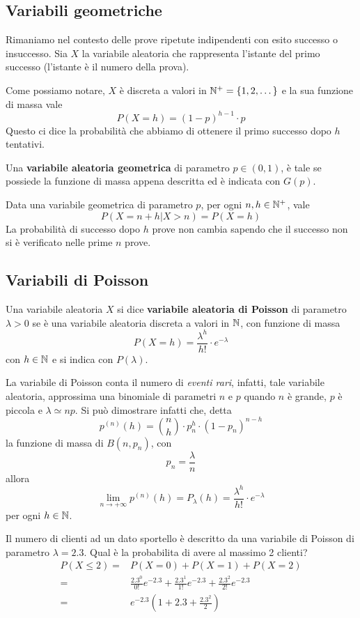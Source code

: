 \subsection{Variabili geometriche}
Rimaniamo nel contesto delle prove ripetute indipendenti con esito successo o insuccesso. Sia $X$
la variabile aleatoria che rappresenta l'istante del primo successo (l'istante è il numero della
prova).

Come possiamo notare, $X$ è discreta a valori in $\mathbb{N}^+ = \{ 1, 2, \dots \}$ e la sua funzione di
massa vale
\[ P(X = h) = (1-p)^{h-1} \cdot p \]
Questo ci dice la probabilità che abbiamo di ottenere il primo successo dopo $h$ tentativi.

Una \textbf{variabile aleatoria geometrica} di parametro $p \in (0,1)$, è tale se possiede la
funzione di massa appena descritta ed è indicata con $G(p)$.

\begin{proposition}
	Data una variabile geometrica di parametro $p$, per ogni $n,h \in \mathbb{N}^+$, vale
	\[ P(X = n + h | X > n) = P(X = h) \]
	La probabilità di successo dopo $h$ prove non cambia sapendo che il successo non si è
	verificato nelle prime $n$ prove.
\end{proposition}

\subsection{Variabili di Poisson}
Una variabile aleatoria $X$ si dice \textbf{variabile aleatoria di Poisson} di parametro
$\lambda > 0$ se è una variabile aleatoria discreta a valori in $\mathbb{N}$, con funzione di massa
\[ P(X = h) = \frac{\lambda^h}{h!} \cdot e^{-\lambda} \]
con $h \in \mathbb{N}$ e si indica con $P(\lambda)$.

La variabile di Poisson conta il numero di \emph{eventi rari}, infatti, tale variabile aleatoria,
approssima una binomiale di parametri $n$ e $p$ quando $n$ è grande, $p$ è piccola e
$\lambda \simeq np$. Si può dimostrare infatti che, detta
\[ p^{(n)} (h) = \binom{n}{h} \cdot p_n^h \cdot \left( 1-p_n \right)^{n-h} \]
la funzione di massa di $B(n, p_n)$, con
\[ p_n = \frac{\lambda}{n} \]
allora
\[ \lim_{n \to +\infty} p^{(n)} (h) = P_\lambda (h) = \frac{\lambda^h}{h!} \cdot e^{-\lambda} \]
per ogni $h \in \mathbb{N}$.

\begin{example}
	Il numero di clienti ad un dato sportello è descritto da una variabile di Poisson di parametro
	$\lambda = 2.3$. Qual è la probabilita di avere al massimo 2 clienti?
	\begin{align*}
		P(X \leq 2) = & P(X = 0) + P(X = 1) + P(X = 2)                          \\
		=             & \frac{2.3^0}{0!} e^{-2.3} + \frac{2.3^1}{1!} e^{-2.3} +
		\frac{2.3^2}{2!} e^{-2.3}                                               \\
		=             & e^{-2.3} \left( 1 + 2.3 + \frac{2.3^2}{2} \right)
	\end{align*}
\end{example}

